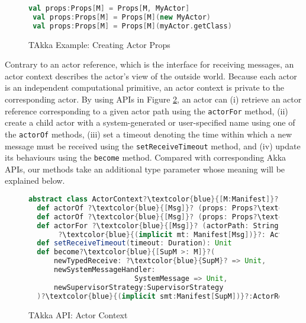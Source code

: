 \begin{figure}[h]
\label{takka_props}
\begin{lstlisting}[language=scala, escapechar=?]
 val props:Props[M] = Props[M, MyActor]
 val props:Props[M] = Props[M](new MyActor)
 val props:Props[M] = Props[M](myActor.getClass)
\end{lstlisting}
    \caption{TAkka Example: Creating Actor Props}
\end{figure}


Contrary to an actor reference, which is the interface for receiving messages, 
an actor context describes the actor's view of the outside world.   Because 
each actor is an independent computational 
primitive, an actor context is private to the corresponding actor.  By using 
APIs in Figure \ref{ActorContext}, an actor can (i) retrieve an actor reference 
corresponding to a given actor path using the {\tt actorFor} method, (ii) 
create a child actor with a system-generated or user-specified name using one 
of the {\tt actorOf} methods, (iii) set a timeout denoting the time within which
a new message must be received using the {\tt setReceiveTimeout} method, and
(iv) update its behaviours using the {\tt become} method.  Compared with 
corresponding Akka APIs, our methods take an additional type parameter whose 
meaning will be explained below.

\begin{figure}[h]
\label{ActorContext}
      \begin{lstlisting}[language=scala, escapechar=?]
abstract class ActorContext?\textcolor{blue}{[M:Manifest]}?
  def actorOf ?\textcolor{blue}{[Msg]}? (props: Props?\textcolor{blue}{[Msg])(implicit mt: Manifest[Msg]}?): ActorRef?\textcolor{blue}{[Msg]}?
  def actorOf ?\textcolor{blue}{[Msg]}? (props: Props?\textcolor{blue}{[Msg]}?, name: String)?\textcolor{blue}{(implicit mt: Manifest[Msg])}?: ActorRef?\textcolor{blue}{[Msg]}?
  def actorFor ?\textcolor{blue}{[Msg]}? (actorPath: String)
       ?\textcolor{blue}{(implicit mt: Manifest[Msg])}?: ActorRef?\textcolor{blue}{[Msg]}?
  def setReceiveTimeout(timeout: Duration): Unit
  def become?\textcolor{blue}{[SupM >: M]}?(
      newTypedReceive: ?\textcolor{blue}{SupM}? => Unit,
      newSystemMessageHandler:
                         SystemMessage => Unit,
      newSupervisorStrategy:SupervisorStrategy
  )?\textcolor{blue}{(implicit smt:Manifest[SupM])}?:ActorRef?\textcolor{blue}{[SupM]}?
    \end{lstlisting}
    \caption{TAkka API: Actor Context}
\end{figure}

